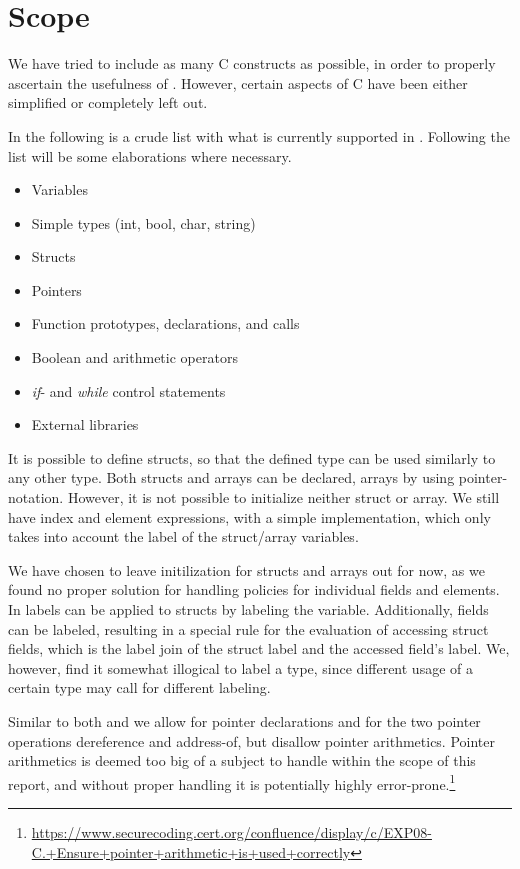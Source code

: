 
\section{Scope}\label{ctif:scope}
We have tried to include as many C constructs as possible, in order to properly ascertain the usefulness of \thelang.
However, certain aspects of C have been either simplified or completely left out.

In the following is a crude list with what is currently supported in \thelang.
Following the list will be some elaborations where necessary.
\begin{itemize}
  \item Variables
  \item Simple types (int, bool, char, string)
  \item Structs
  \item Pointers
  \item Function prototypes, declarations, and calls
  \item Boolean and arithmetic operators
  \item \emph{if}- and \emph{while} control statements
  \item External libraries
\end{itemize}

It is possible to define structs, so that the defined type can be used similarly to any other type.
Both structs and arrays can be declared, arrays by using pointer-notation.
However, it is not possible to initialize neither struct or array.
We still have index and element expressions, with a simple implementation, which only takes into account the label of the struct/array variables.

We have chosen to leave initilization for structs and arrays out for now, as we found no proper solution for handling policies for individual fields and elements.
In \cite{myers1997} labels can be applied to structs by labeling the variable.
Additionally, fields can be labeled, resulting in a special rule for the evaluation of accessing struct fields, which is the label join of the struct label and the accessed field's label.
We, however, find it somewhat illogical to label a type, since different usage of a certain type may call for different labeling.

Similar to both \cite{muller2015cif} and \cite{maciazek2016cbif} we allow for pointer declarations and for the two pointer operations dereference and address-of, but disallow pointer arithmetics.
Pointer arithmetics is deemed too big of a subject to handle within the scope of this report, and without proper handling it is potentially highly error-prone.\footnote{\url{https://www.securecoding.cert.org/confluence/display/c/EXP08-C.+Ensure+pointer+arithmetic+is+used+correctly}}

